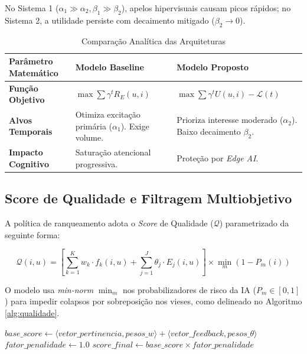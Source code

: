 No Sistema 1 ($\alpha_1 \gg \alpha_2, \beta_1 \gg \beta_2$), apelos hipervisuais causam picos rápidos; no Sistema 2, a utilidade persiste com decaimento mitigado ($\beta_2 \to 0$).

\begin{table}[htpb]
\centering
\caption{Comparação Analítica das Arquiteturas}
\label{tab:comparacao}
\small
\begin{tabularx}{\textwidth}{@{} >{\raggedright\arraybackslash}p{3.5cm} >{\raggedright\arraybackslash}X >{\raggedright\arraybackslash}X @{}}
\toprule
\textbf{Parâmetro Matemático} & \textbf{Modelo Baseline} & \textbf{Modelo Proposto} \\
\midrule
\textbf{Função Objetivo} & $\max \sum \gamma^t R_E(u,i)$ & $\max \sum \gamma^t U(u,i) - \mathcal{L}(t)$ \\
\addlinespace
\textbf{Alvos Temporais} & Otimiza excitação primária ($\alpha_1$). Exige volume. & Prioriza interesse moderado ($\alpha_2$). Baixo decaimento $\beta_2$. \\
\addlinespace
\textbf{Impacto Cognitivo} & Saturação atencional progressiva. & Proteção por \textit{Edge AI}. \\
\bottomrule
\end{tabularx}
\end{table}

\subsection{Score de Qualidade e Filtragem Multiobjetivo}
A política de ranqueamento adota o \textit{Score} de Qualidade ($\mathcal{Q}$) parametrizado da seguinte forma:

\begin{equation} \label{eq:score}
    \mathcal{Q}(i,u) = \left[ \sum_{k=1}^{K} w_k \cdot f_k(i,u) + \sum_{j=1}^{J} \theta_j \cdot E_j(i,u) \right] \times \min_{m} \left( 1 - P_m(i) \right)
\end{equation}

O modelo usa \textit{min-norm} $\min_m$ nos probabilizadores de risco da IA ($P_m \in [0,1]$) para impedir colapsos por sobreposição nos vieses, como delineado no Algoritmo \ref{alg:qualidade}.

\begin{algorithm}[h]
\caption{Cálculo do Score de Qualidade (Otimização do Sistema 2)}
\label{alg:qualidade}
$base\_score \gets \langle vetor\_pertinencia, pesos\_w \rangle + \langle vetor\_feedback, pesos\_\theta \rangle$\;
$fator\_penalidade \gets 1.0$\;
$score\_final \gets base\_score \times fator\_penalidade$\;
\;
\end{algorithm}


